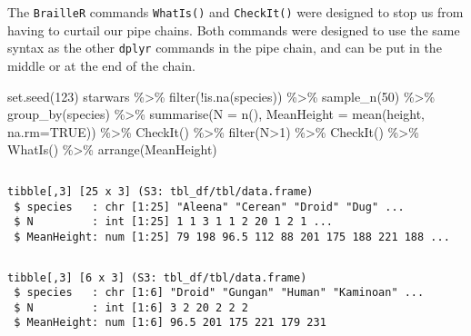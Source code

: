 \documentclass[
]{book}
\newenvironment{Shaded}{\begin{snugshade}}{\end{snugshade}}
\newcommand{\AttributeTok}[1]{\textcolor[rgb]{0.77,0.63,0.00}{#1}}
\newcommand{\ConstantTok}[1]{\textcolor[rgb]{0.00,0.00,0.00}{#1}}
\newcommand{\DecValTok}[1]{\textcolor[rgb]{0.00,0.00,0.81}{#1}}
\newcommand{\FunctionTok}[1]{\textcolor[rgb]{0.00,0.00,0.00}{#1}}
\newcommand{\NormalTok}[1]{#1}
\newcommand{\SpecialCharTok}[1]{\textcolor[rgb]{0.00,0.00,0.00}{#1}}
\begin{document}
The \texttt{BrailleR} commands \texttt{WhatIs()} and \texttt{CheckIt()} were designed to stop us from having to curtail our pipe chains. Both commands were designed to use the same syntax as the other \texttt{dplyr} commands in the pipe chain, and can be put in the middle or at the end of the chain.

\begin{Shaded}
\begin{Highlighting}[]
\FunctionTok{set.seed}\NormalTok{(}\DecValTok{123}\NormalTok{)}
\NormalTok{starwars }\SpecialCharTok{\%\textgreater{}\%} \FunctionTok{filter}\NormalTok{(}\SpecialCharTok{!}\FunctionTok{is.na}\NormalTok{(species)) }\SpecialCharTok{\%\textgreater{}\%} \FunctionTok{sample\_n}\NormalTok{(}\DecValTok{50}\NormalTok{) }\SpecialCharTok{\%\textgreater{}\%} \FunctionTok{group\_by}\NormalTok{(species) }\SpecialCharTok{\%\textgreater{}\%} \FunctionTok{summarise}\NormalTok{(}\AttributeTok{N =} \FunctionTok{n}\NormalTok{(), }\AttributeTok{MeanHeight =} \FunctionTok{mean}\NormalTok{(height, }\AttributeTok{na.rm=}\ConstantTok{TRUE}\NormalTok{)) }\SpecialCharTok{\%\textgreater{}\%} \FunctionTok{CheckIt}\NormalTok{() }\SpecialCharTok{\%\textgreater{}\%} \FunctionTok{filter}\NormalTok{(N}\SpecialCharTok{\textgreater{}}\DecValTok{1}\NormalTok{) }\SpecialCharTok{\%\textgreater{}\%} \FunctionTok{CheckIt}\NormalTok{() }\SpecialCharTok{\%\textgreater{}\%} \FunctionTok{WhatIs}\NormalTok{() }\SpecialCharTok{\%\textgreater{}\%} \FunctionTok{arrange}\NormalTok{(MeanHeight) }
\end{Highlighting}
\end{Shaded}

\begin{verbatim}
\end{verbatim}

\begin{verbatim}
tibble[,3] [25 x 3] (S3: tbl_df/tbl/data.frame)
 $ species   : chr [1:25] "Aleena" "Cerean" "Droid" "Dug" ...
 $ N         : int [1:25] 1 1 3 1 1 2 20 1 2 1 ...
 $ MeanHeight: num [1:25] 79 198 96.5 112 88 201 175 188 221 188 ...
\end{verbatim}

\begin{verbatim}
\end{verbatim}

\begin{verbatim}
tibble[,3] [6 x 3] (S3: tbl_df/tbl/data.frame)
 $ species   : chr [1:6] "Droid" "Gungan" "Human" "Kaminoan" ...
 $ N         : int [1:6] 3 2 20 2 2 2
 $ MeanHeight: num [1:6] 96.5 201 175 221 179 231
\end{verbatim}
\end{document}
